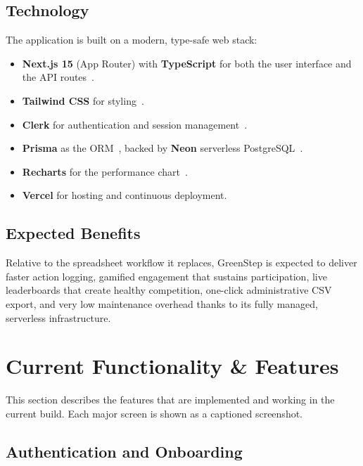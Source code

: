 \documentclass[12pt]{article}
\begin{document}
\subsection{Technology}

The application is built on a modern, type-safe web stack:

\begin{itemize}
    \item \textbf{Next.js 15} (App Router) with \textbf{TypeScript} for both
    the user interface and the API routes~\cite{nextjs}.
    \item \textbf{Tailwind CSS} for styling~\cite{tailwind}.
    \item \textbf{Clerk} for authentication and session
    management~\cite{clerk}.
    \item \textbf{Prisma} as the ORM~\cite{prisma}, backed by
    \textbf{Neon} serverless PostgreSQL~\cite{neon}.
    \item \textbf{Recharts} for the performance chart~\cite{recharts}.
    \item \textbf{Vercel} for hosting and continuous deployment.
\end{itemize}

\subsection{Expected Benefits}

Relative to the spreadsheet workflow it replaces, GreenStep is expected to
deliver faster action logging, gamified engagement that sustains
participation, live leaderboards that create healthy competition, one-click
administrative CSV export, and very low maintenance overhead thanks to its
fully managed, serverless infrastructure.

\section{Current Functionality \& Features}

This section describes the features that are implemented and working in the
current build. Each major screen is shown as a captioned screenshot.

\subsection{Authentication and Onboarding}
\end{document}
